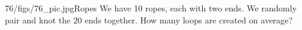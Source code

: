 \begin{problem}{76/figs/76_pic.jpg}{Ropes} We have 10 ropes, each with two ends. We randomly pair and knot the 20 ends together. How many loops are created on average?
\end{problem}
